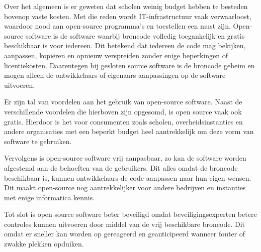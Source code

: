 Over het algemeen is er geweten dat scholen weinig budget hebben te besteden bovenop vaste kosten. Met die reden wordt IT-infrastructuur vaak verwaarloost, waardoor nood aan open-source programma's en toestellen een must zijn. Open-source software is de software waarbij broncode volledig toegankelijk en gratis beschikbaar is voor iedereen. Dit betekend dat iedereen de code mag bekijken, aanpassen, kopiëren en opnieuw verspreiden zonder enige beperkingen of licentiekosten. Daarentegen bij gesloten source software is de broncode geheim en mogen alleen de ontwikkelaars of eigenaars aanpassingen op de software uitvoeren. \newline

Er zijn tal van voordelen aan het gebruik van open-source software. Naast de verschillende voordelen die hierboven zijn opgesomd, is open source vaak ook gratis. Hierdoor is het voor consumenten zoals scholen, overheidsinstanties en andere organisaties met een beperkt budget heel aantrekkelijk om deze vorm van software te gebruiken.

Vervolgens is open-source software vrij aanpasbaar, zo kan de software worden afgestemd aan de behoeften van de gebruikers. Dit alles omdat de broncode beschikbaar is, kunnen ontwikkelaars de code aanpassen naar hun eigen wensen. Dit maakt open-source nog aantrekkelijker voor andere bedrijven en instanties met enige informatica kennis. 

Tot slot is open source software beter beveiligd omdat beveiligingsexperten betere controles kunnen uitvoeren door middel van de vrij beschikbare broncode. Dit omdat er sneller kan worden op gereageerd en geanticipeerd wanneer fouter of zwakke plekken opduiken. \autocite{opensource}

